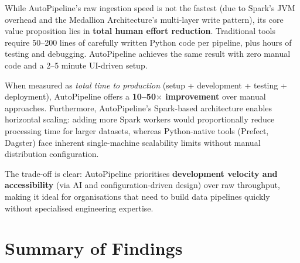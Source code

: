 \documentclass[12pt, a4paper]{article}
\begin{document}
While AutoPipeline's raw ingestion speed is not the fastest (due to Spark's JVM overhead and the Medallion Architecture's multi-layer write pattern), its core value proposition lies in \textbf{total human effort reduction}. Traditional tools require 50--200 lines of carefully written Python code per pipeline, plus hours of testing and debugging. AutoPipeline achieves the same result with zero manual code and a 2--5 minute UI-driven setup.

When measured as \textit{total time to production} (setup + development + testing + deployment), AutoPipeline offers a \textbf{10--50$\times$ improvement} over manual approaches. Furthermore, AutoPipeline's Spark-based architecture enables horizontal scaling: adding more Spark workers would proportionally reduce processing time for larger datasets, whereas Python-native tools (Prefect, Dagster) face inherent single-machine scalability limits without manual distribution configuration.

The trade-off is clear: AutoPipeline prioritises \textbf{development velocity and accessibility} (via AI and configuration-driven design) over raw throughput, making it ideal for organisations that need to build data pipelines quickly without specialised engineering expertise.


\section{Summary of Findings}
\end{document}
